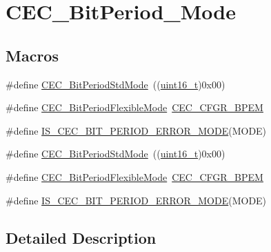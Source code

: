 \hypertarget{group___c_e_c___bit_period___mode}{}\section{C\+E\+C\+\_\+\+Bit\+Period\+\_\+\+Mode}
\label{group___c_e_c___bit_period___mode}
\subsection*{Macros}
\begin{DoxyCompactItemize}
\item 
\#define \hyperlink{group___c_e_c___bit_period___mode_ga746ce0a831dfd76a47add310662c7f07}{C\+E\+C\+\_\+\+Bit\+Period\+Std\+Mode}~((\hyperlink{_p_e___types_8h_a1f1825b69244eb3ad2c7165ddc99c956}{uint16\+\_\+t})0x00)
\item 
\#define \hyperlink{group___c_e_c___bit_period___mode_ga5bf4c1b257b837770d4d59c93cca6902}{C\+E\+C\+\_\+\+Bit\+Period\+Flexible\+Mode}~\hyperlink{group___peripheral___registers___bits___definition_ga48c747693ec4dac8e4288ae4c0949def}{C\+E\+C\+\_\+\+C\+F\+G\+R\+\_\+\+B\+P\+EM}
\item 
\#define \hyperlink{group___c_e_c___bit_period___mode_ga3414347854a83bf70748624ec5b8dd49}{I\+S\+\_\+\+C\+E\+C\+\_\+\+B\+I\+T\+\_\+\+P\+E\+R\+I\+O\+D\+\_\+\+E\+R\+R\+O\+R\+\_\+\+M\+O\+DE}(M\+O\+DE)
\item 
\#define \hyperlink{group___c_e_c___bit_period___mode_ga746ce0a831dfd76a47add310662c7f07}{C\+E\+C\+\_\+\+Bit\+Period\+Std\+Mode}~((\hyperlink{_p_e___types_8h_a1f1825b69244eb3ad2c7165ddc99c956}{uint16\+\_\+t})0x00)
\item 
\#define \hyperlink{group___c_e_c___bit_period___mode_ga5bf4c1b257b837770d4d59c93cca6902}{C\+E\+C\+\_\+\+Bit\+Period\+Flexible\+Mode}~\hyperlink{group___peripheral___registers___bits___definition_ga48c747693ec4dac8e4288ae4c0949def}{C\+E\+C\+\_\+\+C\+F\+G\+R\+\_\+\+B\+P\+EM}
\item 
\#define \hyperlink{group___c_e_c___bit_period___mode_ga3414347854a83bf70748624ec5b8dd49}{I\+S\+\_\+\+C\+E\+C\+\_\+\+B\+I\+T\+\_\+\+P\+E\+R\+I\+O\+D\+\_\+\+E\+R\+R\+O\+R\+\_\+\+M\+O\+DE}(M\+O\+DE)
\end{DoxyCompactItemize}


\subsection{Detailed Description}


